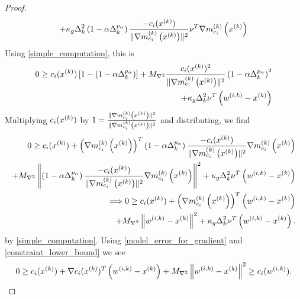 \begin{proof}
\begin{align*}
+ \kappa_g \Delta_k^2 \left(1 - \alpha \Delta_k^{p_{\alpha}}\right)\frac{-c_i(x^{(k)})}{\|{\nabla m_{c_i}^{(k)}\left(x^{(k)}\right)}\|^2}\nu^T{\nabla m_{c_i}^{(k)}\left(x^{(k)}\right)}
\end{align*}
Using \cref{simple_computation}, this is
\begin{align*}
0 \ge c_i(x^{(k)})\left[1 - \left(1 - \alpha \Delta_k^{p_{\alpha}}\right)\right] 
+ {M_{\nabla^2}} \frac {c_i(x^{(k)})^2}{\|{\nabla m_{c_i}^{(k)}\left(x^{(k)}\right)}\|^2}\left(1 - \alpha \Delta_k^{p_{\alpha}}\right)^2 \\
+ \kappa_g \Delta_k^2\nu^T \left({w^{(i, k)}} - x^{(k)}\right)
\end{align*}
Multiplying $c_i(x^{(k)})$ by $1 = \frac{\|{\nabla m_{c_i}^{(k)}\left(x^{(k)}\right)}\|^2}{\|{\nabla m_{c_i}^{(k)}\left(x^{(k)}\right)}\|^2}$ and distributing, we find
\begin{align*}
0 \ge c_i(x^{(k)}) + \left({\nabla m_{c_i}^{(k)}\left(x^{(k)}\right)}\right)^T\left(1 - \alpha \Delta_k^{p_{\alpha}}\right)\frac{-c_i(x^{(k)})}{\|{\nabla m_{c_i}^{(k)}\left(x^{(k)}\right)}\|^2}{\nabla m_{c_i}^{(k)}\left(x^{(k)}\right)}  \\
+ {M_{\nabla^2}} \left\|\left(1 - \alpha \Delta_k^{p_{\alpha}}\right)\frac{-c_i(x^{(k)})}{\|{\nabla m_{c_i}^{(k)}\left(x^{(k)}\right)}\|^2}{\nabla m_{c_i}^{(k)}\left(x^{(k)}\right)}\right\|^2
+ \kappa_g \Delta_k^2\nu^T \left({w^{(i, k)}} - x^{(k)}\right) \\
\Longrightarrow 0 \ge c_i(x^{(k)}) + \left({\nabla m_{c_i}^{(k)}\left(x^{(k)}\right)}\right)^T\left({w^{(i, k)}} - x^{(k)}\right) \\
+ {M_{\nabla^2}} \left\|{w^{(i, k)}} - x^{(k)}\right\|^2  + \kappa_g \Delta_k^2\nu^T \left({w^{(i, k)}} - x^{(k)}\right).
\end{align*}
by \cref{simple_computation}.
Using \cref{model_error_for_gradient} and \cref{constraint_lower_bound} we see
\begin{align}
0 \ge c_i(x^{(k)}) + \nabla c_i(x^{(k)})^T\left({w^{(i, k)}} - x^{(k)} \right) + {M_{\nabla^2}} \left\|{w^{(i, k)}} - x^{(k)}\right\|^2 \ge c_i({w^{(i, k)}}). \label{c_is_negative}
\end{align}


\end{proof}
